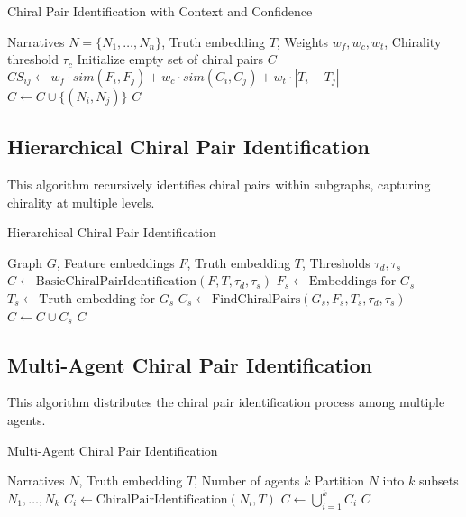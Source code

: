 \documentclass{article}
\begin{document}
\begin{algorithm}[H]
\caption{Chiral Pair Identification with Context and Confidence}
\begin{algorithmic}[1]
\Require Narratives $N = \{N_1, \dots, N_n\}$, Truth embedding $T$, Weights $w_f, w_c, w_t$, Chirality threshold $\tau_c$
\State Initialize empty set of chiral pairs $C$
    \State $CS_{ij} \gets w_f \cdot sim(F_i, F_j) + w_c \cdot sim(C_i, C_j) + w_t \cdot |T_i - T_j|$
     
        \State $C \gets C \cup \{(N_i, N_j)\}$
    \EndIf
\EndFor
\Return $C$
\end{algorithmic}
\end{algorithm}


\subsection{Hierarchical Chiral Pair Identification}

This algorithm recursively identifies chiral pairs within subgraphs, capturing chirality at multiple levels.

\begin{algorithm}[H]
\caption{Hierarchical Chiral Pair Identification}
\begin{algorithmic}[1]
\Require Graph $G$, Feature embeddings $F$, Truth embedding $T$, Thresholds $\tau_d, \tau_s$
    \State $C \gets \text{BasicChiralPairIdentification}(F, T, \tau_d, \tau_s)$
        \State $F_s \gets \text{Embeddings for } G_s$
        \State $T_s \gets \text{Truth embedding for } G_s$ 
        \State $C_s \gets \text{FindChiralPairs}(G_s, F_s, T_s, \tau_d, \tau_s)$
        \State $C \gets C \cup C_s$
    \EndFor
    \Return $C$
\EndFunction
\end{algorithmic}
\end{algorithm}


\subsection{Multi-Agent Chiral Pair Identification}

This algorithm distributes the chiral pair identification process among multiple agents.

\begin{algorithm}[H]
\caption{Multi-Agent Chiral Pair Identification}
\begin{algorithmic}[1]
\Require Narratives $N$, Truth embedding $T$, Number of agents $k$
\State Partition $N$ into $k$ subsets $N_1, \dots, N_k$
    \State $C_i \gets \text{ChiralPairIdentification}(N_i, T)$ 
\EndFor
\State $C \gets \bigcup_{i=1}^k C_i$
\State {}
\Return $C$
\end{algorithmic}
\end{algorithm}
\end{document}
